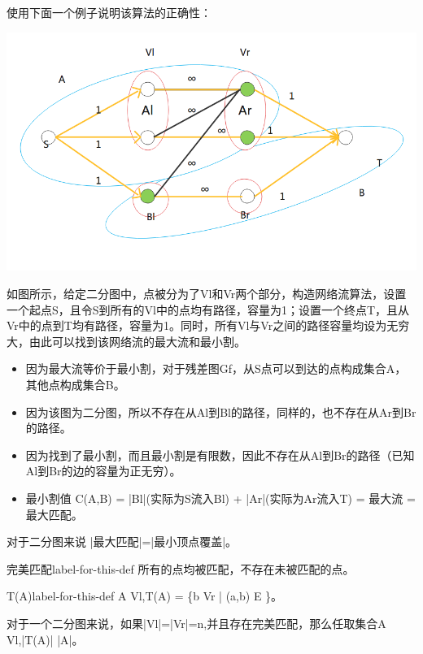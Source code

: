 使用下面一个例子说明该算法的正确性：\\
\centerline{\includegraphics[scale=0.6]{image/networkflow3.png}}
\begin{example}
  如图所示，给定二分图中，点被分为了Vl和Vr两个部分，构造网络流算法，设置一个起点S，且令S到所有的Vl中的点均有路径，容量为1；设置一个终点T，且从Vr中的点到T均有路径，容量为1。同时，所有Vl与Vr之间的路径容量均设为无穷大，由此可以找到该网络流的最大流和最小割。
\end{example}
\begin{itemize}
  \item 因为最大流等价于最小割，对于残差图Gf，从S点可以到达的点构成集合A，其他点构成集合B。
  \item 因为该图为二分图，所以不存在从Al到Bl的路径，同样的，也不存在从Ar到Br的路径。
  \item 因为找到了最小割，而且最小割是有限数，因此不存在从Al到Br的路径（已知Al到Br的边的容量为正无穷）。
  \item 最小割值 C(A,B) = |Bl|(实际为S流入Bl) + |Ar|(实际为Ar流入T) = 最大流 = 最大匹配。
\end{itemize}
对于二分图来说 |最大匹配|=|最小顶点覆盖|。

\begin{definition}{完美匹配}{label-for-this-def}
    所有的点均被匹配，不存在未被匹配的点。
\end{definition}

\begin{definition}{T(A)}{label-for-this-def}
  A \subseteq Vl,T(A) = \{b \in Vr | (a,b) \in E \}。
\end{definition}

对于一个二分图来说，如果|Vl|=|Vr|=n,并且存在完美匹配，那么任取集合A \subseteq Vl,|T(A)| \ge |A|。

